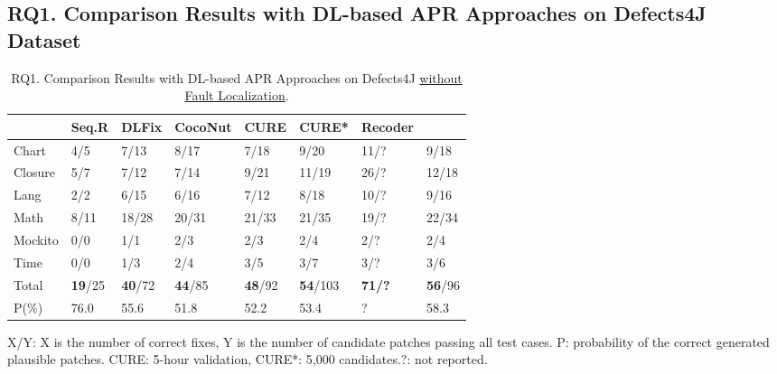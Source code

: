 \subsection{\bf RQ1. Comparison Results with DL-based APR Approaches on Defects4J Dataset}

\begin{table}[t]
  \caption{RQ1. Comparison Results with DL-based APR Approaches on Defects4J \underline {without Fault Localization}.}
  \vspace{-6pt}
  \tabcolsep 4pt
  {\footnotesize
			\begin{center}
				\renewcommand{\arraystretch}{1}
				\begin{tabular}{p{0.8cm}<{\centering}|p{0.8cm}<{\centering}|p{0.9cm}<{\centering}|p{1cm}<{\centering}|p{0.8cm}<{\centering}|p{0.8cm}<{\centering}|p{0.9cm}<{\centering}|p{0.8cm}<{\centering}}
					
					\hline
					&\textbf{Seq.R}&\textbf{DLFix}& \textbf{CocoNut}&\textbf{CURE}&\textbf{CURE*}&\textbf{Recoder}&\textbf{\tool}\\
					\hline
					Chart  & 4/5   & 7/13  & 8/17  & 7/18  & 9/20 & 11/? & 9/18\\
					Closure& 5/7   & 7/12  & 7/14  & 9/21 & 11/19  & 26/? & 12/18\\
					Lang   & 2/2   & 6/15  & 6/16  & 7/12 & 8/18 & 10/? & 9/16\\
					Math    & 8/11  & 18/28 & 20/31 & 21/33 & 21/35 & 19/? & 22/34\\
					Mockito & 0/0   & 1/1   & 2/3   & 2/3  &2/4 & 2/? & 2/4\\
					Time    & 0/0   & 1/3   & 2/4   & 3/5  &3/7 & 3/? & 3/6\\
					\hline
					Total   & {\bf 19}/25 & {\bf 40}/72 & {\bf 44}/85 & {\bf 48}/92 & {\bf 54}/103 & {\bf 71/?} & {\bf 56}/96\\
					\hline
					P(\%)  & 76.0  & 55.6  & 51.8  & 52.2  &  53.4 & ? & 58.3\\
					\hline
				\end{tabular}
			{\footnotesize{
				X/Y: X is the number of correct fixes, Y is the number of candidate patches passing all test cases. P: probability of the correct generated plausible patches. CURE: 5-hour validation, CURE*: 5,000 candidates.?: not reported.}}

				\label{RQ1_defect4j}
			\end{center}
                }
		\end{table}

